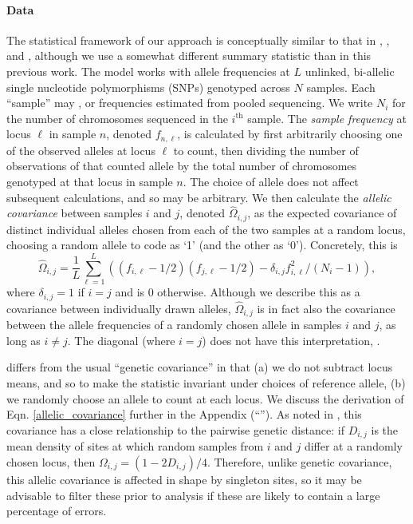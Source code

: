 \documentclass[12pt]{article}
\newcommand{\secref}[1]{``\nameref{#1}''}
\newcommand{\gc}[1]{{\it\color{blue}{(#1)}}}
\begin{document}
\paragraph{Data}
The statistical framework of our approach is conceptually similar to that in \cite{Wasser2004}, \cite{BEDASSLE}, and \cite{spacemix},
although we use a somewhat different summary statistic than in this previous work.
The model works with allele frequencies at $L$ unlinked, bi-allelic single nucleotide polymorphisms (SNPs) genotyped across $N$ samples.
Each ``sample'' may \gc{be a single individual, a collection of
  individuals from a location}, or frequencies estimated from pooled sequencing.
We write $N_i$ for the number of chromosomes sequenced in the $i^\text{th}$ sample.
The \emph{sample frequency} at locus $\ell$ in sample $n$, denoted $f_{n,\ell}$, 
is calculated by first arbitrarily choosing one of the observed alleles at locus $\ell$ to count, 
then dividing the number of observations of that counted allele by the total number of chromosomes genotyped at that locus
in sample $n$.
The choice of allele does not affect subsequent calculations, and so may be arbitrary.
We then calculate the \emph{allelic covariance} between samples $i$ and $j$, denoted $\widehat{\Omega}_{i,j}$,
as the expected covariance of distinct individual alleles chosen from each of the two samples at a random locus,
choosing a random allele to code as `1' (and the other as `0').
Concretely, this is
\begin{equation}
\widehat{\Omega}_{i,j} = 
    \frac{1}{L} \sum_{\ell=1}^L \left( (f_{i,\ell}-1/2) (f_{j,\ell}-1/2) - \delta_{i,j} f_{i,\ell}^2 / (N_i-1) \right),
\label{allelic_covariance}
\end{equation}
where $\delta_{i,j}=1$ if $i=j$ and is 0 otherwise.
Although we describe this as a covariance between individually drawn alleles,
$\widehat{\Omega}_{i,j}$ is in fact also the covariance between the allele frequencies
of a randomly chosen allele in samples $i$ and $j$, as long as $i \neq j$.
The diagonal (where $i=j$) does not have this interpretation, \gc{and
  reflects the covariance between indivdual alleles drawn from within
  the population}.

\gc{This definition of convariance} differs from the usual ``genetic covariance'' \citep{mcvean_genealogical_2009}
in that (a) we do not subtract locus means,
and so to make the statistic invariant under choices of reference allele, 
(b) we randomly choose an allele to count at each locus.
We discuss the derivation of Eqn. \eqref{allelic_covariance} further in the Appendix (\secref{allelic_cov}).
As noted in \cite{EEMS},
this covariance has a close relationship to the pairwise genetic distance:
if $D_{i,j}$ is the mean density of sites at which random samples from $i$ and $j$ differ at a randomly chosen locus,
then $\Omega_{i,j} = (1 - 2 D_{i,j})/4$.
Therefore, unlike genetic covariance,
this allelic covariance is \gc{more} affected in shape by singleton sites,
so it may be advisable to filter these prior to analysis
if these are likely to contain a large percentage of errors.
\end{document}
